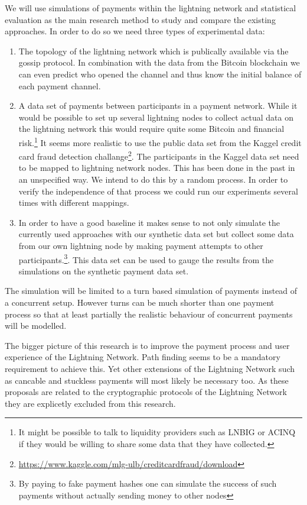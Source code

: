 \documentclass[a4paper]{paper}
\begin{document}
We will use simulations of payments within the lightning network and statistical evaluation as the main research method to study and compare the existing approaches.
In order to do so we need three types of experimental data:
\begin{enumerate}
\item The topology of the lightning network which is publically available via the gossip protocol. In combination with the data from the Bitcoin blockchain we can even predict who opened the channel and thus know the initial balance of each payment channel.
\item A data set of payments between participants in a payment network. While it would be possible to set up several lightning nodes to collect actual data on the lightning network this would require quite some Bitcoin and financial risk.\footnote{It might be possible to talk to liquidity providers such as LNBIG or ACINQ if they would be willing to share some data that they have collected.} It seems more realistic to use the public data set from the Kaggel credit card fraud detection challange\footnote{\url{https://www.kaggle.com/mlg-ulb/creditcardfraud/download}}. The participants in the Kaggel data set need to be mapped to lightning network nodes. This has been done in the past \cite{sivaraman2018routing} in an unspecified way. We intend to do this by a random process. In order to verify the independence of that process we could run our experiments several times with different mappings. 
\item In order to have a good baseline it makes sense to not only simulate the currently used approaches with our synthetic data set but collect some data from our own lightning node by making payment attempts to other participants.\footnote{By paying to fake payment hashes one can simulate the success of such payments without actually sending money to other nodes}. This data set can be used to gauge the results from the simulations on the synthetic payment data set.
\end{enumerate}

The simulation will be limited to a turn based simulation of payments instead of a concurrent setup.
However turns can be much shorter than one payment process so that at least partially the realistic behaviour of concurrent payments will be modelled. 

The bigger picture of this research is to improve the payment process and user experience of the Lightning Network.
Path finding seems to be a mandatory requirement to achieve this.
Yet other extensions of the Lightning Network such as cancable and stuckless payments\cite{gondo2019stucklss} will most likely be necessary too.
As these proposals are related to the cryptographic protocols of the Lightning Network they are explicetly excluded from this research.
\end{document}
